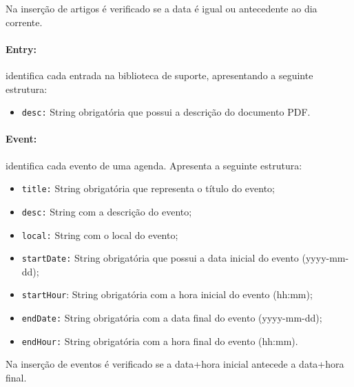 Na inserção de artigos é verificado se a data é igual ou antecedente ao dia corrente.

\paragraph{\textbf{Entry:}} identifica cada entrada na biblioteca de suporte, apresentando a seguinte estrutura:
    \begin{itemize}
        \item \texttt{desc:} String obrigatória que possui a descrição do documento PDF.
    \end{itemize}
        
\paragraph{\textbf{Event:}} identifica cada evento de uma agenda. Apresenta a seguinte estrutura:
    \begin{itemize}
        \item \texttt{title:} String obrigatória que representa o título do evento;
        \item \texttt{desc:} String com a descrição do evento;
        \item \texttt{local:} String com o local do evento;
        \item \texttt{startDate:} String obrigatória que possui a data inicial do evento (yyyy-mm-dd);
        \item \texttt{startHour}: String obrigatória com a hora inicial do evento (hh:mm);
        \item \texttt{endDate:} String obrigatória com a data final do evento (yyyy-mm-dd);
        \item \texttt{endHour:} String obrigatória com a hora final do evento (hh:mm).
    \end{itemize}
Na inserção de eventos é verificado se a data+hora inicial antecede a data+hora final.
    
